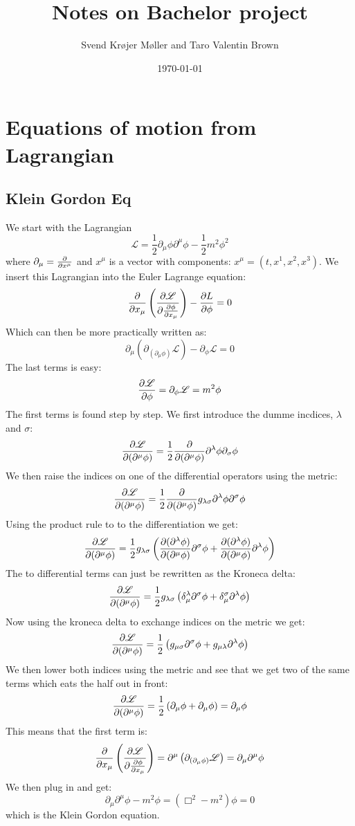 \documentclass[a4,10pt,titlepage]{article}
\date{\today}
\renewcommand\[{\begin{equation*}}
\renewcommand\]{\end{equation*}}
\newcommand{\be}{\begin{equation}}
\newcommand{\ee}{\end{equation}}
\numberwithin{equation}{section}
\newcommand{\lp}{\left}
\newcommand{\rp}{\right}
\newcommand{\Lar}{\mathscr{L}}
\newcommand{\half}{\frac{1}{2}}
\begin{document}
\title{\textbf{Notes on Bachelor project}}
\author{Svend Krøjer Møller and Taro Valentin Brown}
\maketitle
\tableofcontents
\newpage
\section{Equations of motion from Lagrangian}
\subsection{Klein Gordon Eq}
\setcounter{section}{1}
We start with the Lagrangian 
\be
\Lar=\half\partial_\mu\phi\partial^\mu\phi-\half m^2\phi^2
\ee
where $\partial_\mu=\pdv{}{x^\mu}$ and $x^\mu$ is a vector with components: $x^\mu=(t,x^1,x^2,x^3)$. We insert this Lagrangian into the Euler Lagrange equation:
\be
\pdv{}{x_\mu}\lp(\pdv{\Lar}{\pdv{\phi}{x_\mu}}\rp)-\pdv{L}{\phi}=0
\ee
Which can then be more practically written as:
\be
\partial_\mu \lp(\partial_{(\partial_\mu \phi)}\Lar\rp)-\partial_\phi \Lar=0
\ee
The last terms is easy:
\[
\pdv{\Lar}{\phi}=\partial_\phi \Lar=m^2\phi
\]
The first terms is found step by step. We first introduce the dumme incdices, $\lambda$ and $\sigma:$
\[
\pdv{\Lar}{(\partial^\mu \phi)}=\half\pdv{}{(\partial^\mu \phi)} \partial^\lambda\phi\partial_\sigma\phi
\]
We then raise the indices on one of the differential operators using the metric:
\[
\pdv{\Lar}{(\partial^\mu \phi)}=\half\pdv{}{(\partial^\mu \phi)} g_{\lambda\sigma} \partial^\lambda\phi\partial^\sigma\phi
\]
Using the product rule to to the differentiation we get:
\[
\pdv{\Lar}{(\partial^\mu \phi)}=\half g_{\lambda\sigma}\lp( \pdv{(\partial^\lambda\phi)}{(\partial^\mu \phi)}\partial^\sigma\phi+\pdv{(\partial^\lambda\phi)}{(\partial^\mu \phi)}\partial^\lambda\phi\rp)
\]
The to differential terms can just be rewritten as the Kroneca delta:
\[
\pdv{\Lar}{(\partial^\mu \phi)}=\half g_{\lambda\sigma}\lp( \delta_\mu^{\lambda}\partial^\sigma\phi+\delta_\mu^{\sigma}\partial^\lambda\phi\rp)
\]
Now using the kroneca delta to exchange indices on the metric we get:
\[
\pdv{\Lar}{(\partial^\mu \phi)}=\half \lp( g_{\mu\sigma} \partial^\sigma \phi+g_{\mu\lambda}\partial^\lambda\phi\rp)
\]
We then lower both indices using the metric and see that we get two of the same terms which eats the half out in front:
\[
\pdv{\Lar}{(\partial^\mu \phi)}=\half \lp( \partial_\mu \phi+\partial_\mu \phi\rp)=\partial_\mu \phi
\]
This means that the first term is:
\[
\pdv{}{x_\mu}\lp(\pdv{\Lar}{\pdv{\phi}{x_\mu}}\rp)=\partial^\mu \lp(\partial_{(\partial_\mu \phi)}\Lar\rp)=\partial_\mu\partial^\mu\phi
\]
We then plug in and get:
\be
\partial_\mu\partial^\mu\phi-m^2\phi=\lp(\Box^2-m^2\rp)\phi=0
\ee
which is the Klein Gordon equation.
\end{document}
